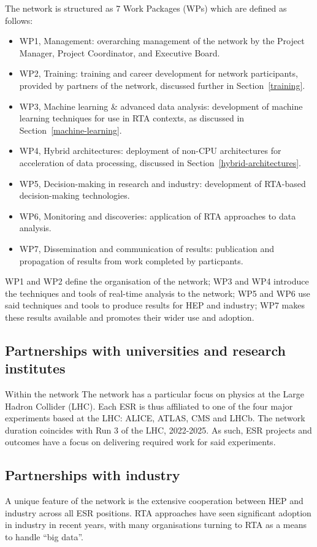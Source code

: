 The network is structured as 7 Work Packages (WPs) which are defined as follows:
\begin{itemize}
    \item WP1, Management: overarching management of the network by the Project Manager, Project Coordinator, and Executive Board.
    \item WP2, Training: training and career development for network participants, provided by partners of the network, discussed further in Section~\ref{training}.
    \item WP3, Machine learning \& advanced data analysis: development of machine learning techniques for use in RTA contexts, as discussed in Section~\ref{machine-learning}.
    \item WP4, Hybrid architectures: deployment of non-CPU architectures for acceleration of data processing, discussed in Section~\ref{hybrid-architectures}.
    \item WP5, Decision-making in research and industry: development of RTA-based decision-making technologies.
    \item WP6, Monitoring and discoveries: application of RTA approaches to data analysis. 
    \item WP7, Dissemination and communication of results: publication and propagation of results from work completed by particpants. 
\end{itemize}   
WP1 and WP2 define the organisation of the network; WP3 and WP4 introduce the techniques and tools of real-time analysis to the network; WP5 and WP6 use said techniques and tools to produce results for HEP and industry; WP7 makes these results available and promotes their wider use and adoption.

\subsection{Partnerships with universities and research institutes}
\label{sec-2}
Within the network 
The network has a particular focus on physics at the Large Hadron Collider (LHC). Each ESR is thus affiliated to one of the four major experiments based at the LHC: ALICE, ATLAS, CMS and LHCb. The network duration coincides with Run 3 of the LHC, 2022-2025. As such, ESR projects and outcomes have a focus on delivering required work for said experiments.

\subsection{Partnerships with industry}
\label{sec-2}
A unique feature of the network is the extensive cooperation between HEP and industry across all ESR positions. RTA approaches have seen significant adoption in industry in recent years, with many organisations turning to RTA as a means to handle ``big data''.